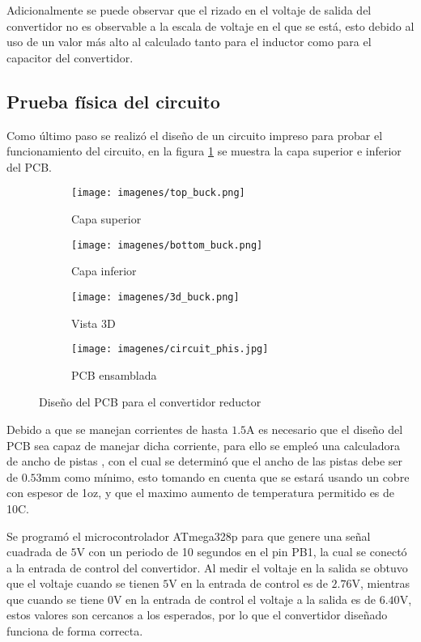 Adicionalmente se puede observar que el rizado en el voltaje de salida del 
convertidor no es observable a la escala de voltaje en el que se está, esto debido
al uso de un valor más alto al calculado tanto para el inductor como para el 
capacitor del convertidor.

                                                                
\subsection{Prueba física del circuito}

Como último paso se realizó el diseño de un circuito impreso para probar el 
funcionamiento del circuito, en la figura \ref{fig:buck_pcb} se muestra la capa
superior e inferior del PCB.

\begin{figure}[H]
    \centering
    \begin{subfigure}{0.45\linewidth}
        \centering
        \texttt{[image: imagenes/top\_buck.png]}
        \caption{Capa superior}
    \end{subfigure}
    \begin{subfigure}{0.45\linewidth}
        \centering
        \texttt{[image: imagenes/bottom\_buck.png]}
        \caption{Capa inferior}
    \end{subfigure}
    \vfill
    \begin{subfigure}{0.45\linewidth}
        \centering
        \texttt{[image: imagenes/3d\_buck.png]}
        \caption{Vista 3D}
    \end{subfigure}
    \begin{subfigure}{0.45\linewidth}
        \centering
        \texttt{[image: imagenes/circuit\_phis.jpg]}
        \caption{PCB ensamblada}
    \end{subfigure}
    \caption{Diseño del PCB para el convertidor reductor}
    \label{fig:buck_pcb}
\end{figure}

Debido a que se manejan corrientes de hasta $1.5\text{A}$ es necesario que el
diseño del PCB sea capaz de manejar dicha corriente, para ello se empleó una 
calculadora de ancho de pistas \cite{noauthor_pcb_nodate}, con el cual se 
determinó que el ancho de las pistas debe ser de $0.53\text{mm}$ como mínimo,
esto tomando en cuenta que se estará usando un cobre con espesor de 1oz, y que
el maximo aumento de temperatura permitido es de 10\textordmasculine C. 

Se programó el microcontrolador ATmega328p para que genere una señal 
cuadrada de $5\text{V}$ con un periodo de 10 segundos en el pin PB1,
la cual se conectó a la entrada de control del convertidor. Al medir el voltaje
en la salida se obtuvo que el voltaje cuando se tienen $5\text{V}$ en la entrada
de control es de $2.76\text{V}$, mientras que cuando se tiene $0\text{V}$
en la entrada de control el voltaje a la salida es de $6.40\text{V}$, estos 
valores son cercanos a los esperados, por lo que el convertidor diseñado
funciona de forma correcta.

